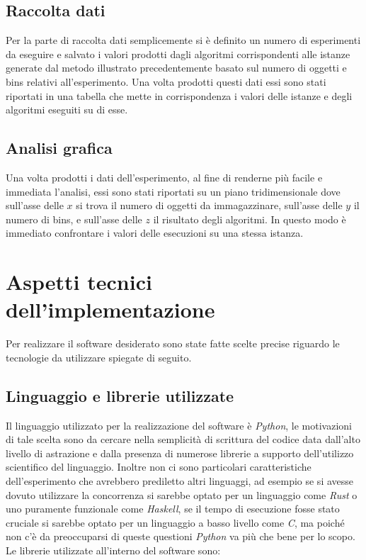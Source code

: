 \subsection{Raccolta dati}
Per la parte di raccolta dati semplicemente si è definito un numero di esperimenti da eseguire e salvato i valori prodotti dagli algoritmi corrispondenti
alle istanze generate dal metodo illustrato precedentemente basato sul numero di oggetti e bins relativi all'esperimento. Una volta prodotti questi dati
essi sono stati riportati in una tabella che mette in corrispondenza i valori delle istanze e degli algoritmi eseguiti su di esse.


\subsection{Analisi grafica}
Una volta prodotti i dati dell'esperimento, al fine di renderne più facile e immediata l'analisi, essi sono stati riportati su un piano tridimensionale 
dove sull'asse delle $ x $ si trova il numero di oggetti da immagazzinare, sull'asse delle $ y $ il numero di bins, e sull'asse delle $ z $
il risultato degli algoritmi. In questo modo è immediato confrontare i valori delle esecuzioni su una stessa istanza.


\section{Aspetti tecnici dell'implementazione}
Per realizzare il software desiderato sono state fatte scelte precise riguardo le tecnologie da utilizzare spiegate di seguito.

\subsection{Linguaggio e librerie utilizzate}
Il linguaggio utilizzato per la realizzazione del software è \textit{Python}, le motivazioni di tale scelta sono da cercare nella semplicità di scrittura 
del codice data dall'alto livello di astrazione e dalla presenza di numerose librerie a supporto dell'utilizzo scientifico del linguaggio. Inoltre
non ci sono particolari caratteristiche dell'esperimento che avrebbero prediletto altri linguaggi, ad esempio se si avesse dovuto utilizzare la concorrenza 
si sarebbe optato per un linguaggio come \textit{Rust} o uno puramente funzionale come \textit{Haskell}, se il tempo di esecuzione fosse stato cruciale si sarebbe
optato per un linguaggio a basso livello come \textit{C}, ma poiché non c'è da preoccuparsi di queste questioni \textit{Python} va più che bene per lo
scopo.\\
Le librerie utilizzate all'interno del software sono:

